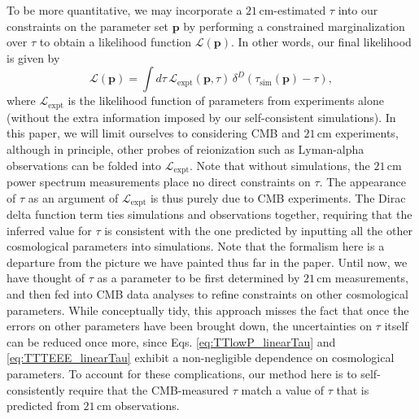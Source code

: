 \documentclass[twocolumn,aps,prd,nofootinbib,showpacs]{revtex4-1}
\begin{document}
To be more quantitative, we may incorporate a $21\,\textrm{cm}$-estimated $\tau$ into our constraints on the parameter set $\mathbf{p}$ by performing a constrained marginalization over $\tau$ to obtain a likelihood function $\mathcal{L} (\mathbf{p})$. In other words, our final likelihood is given by
\begin{equation}
\label{eq:ConstrainedOptimization}
\mathcal{L} (\mathbf{p}) = \int d\tau \, \mathcal{L}_\textrm{expt} ( \mathbf{p}, \tau) \, \delta^D \!\!\left( \tau_\textrm{sim} (\mathbf{p}) - \tau \right),
\end{equation}
where $\mathcal{L}_\textrm{expt}$ is the likelihood function of parameters from experiments alone (without the extra information imposed by our self-consistent simulations). In this paper, we will limit ourselves to considering CMB and $21\,\textrm{cm}$ experiments, although in principle, other probes of reionization such as Lyman-alpha observations can be folded into $\mathcal{L}_\textrm{expt}$. Note that without simulations, the $21\,\textrm{cm}$ power spectrum measurements place no direct constraints on $\tau$. The appearance of $\tau$ as an argument of $\mathcal{L}_\textrm{expt}$ is thus purely due to CMB experiments. The Dirac delta function term ties simulations and observations together, requiring that the inferred value for $\tau$ is consistent with the one predicted by inputting all the other cosmological parameters into simulations. Note that the formalism here is a departure from the picture we have painted thus far in the paper. Until now, we have thought of $\tau$ as a parameter to be first determined by $21\,\textrm{cm}$ measurements, and then fed into CMB data analyses to refine constraints on other cosmological parameters. While conceptually tidy, this approach misses the fact that once the errors on other parameters have been brought down, the uncertainties on $\tau$ itself can be reduced once more, since Eqs. \eqref{eq:TTlowP_linearTau} and \eqref{eq:TTTEEE_linearTau} exhibit a non-negligible dependence on cosmological parameters. To account for these complications, our method here is to self-consistently require that the CMB-measured $\tau$ match a value of $\tau$ that is predicted from $21\,\textrm{cm}$ observations.
\end{document}
